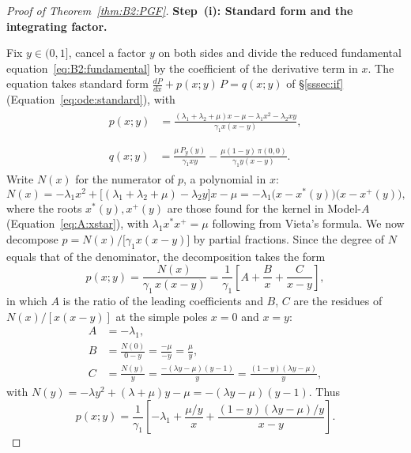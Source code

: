 \begin{proof}[Proof of Theorem~\ref{thm:B2:PGF}]

\medskip\noindent\textbf{Step~(i): Standard form and the integrating factor.}

Fix $y\in(0,1]$, cancel a factor $y$ on both sides and divide the reduced fundamental equation~\eqref{eq:B2:fundamental} by the coefficient of the derivative term in $x$. The equation takes standard form $\tfrac{dP}{dx}+p(x;y)\,P=q(x;y)$ of \S\ref{sssec:if} (Equation~\eqref{eq:ode:standard}), with
\begin{align}
    \begin{split}
        p(x;y) &= \frac{(\lambda_1+\lambda_2+\mu)x - \mu - \lambda_1 x^2 - \lambda_2 xy}{\gamma_1 x(x-y)},
        \label{eq:B2:pxy}\\[4pt]
    \end{split} \\
    \begin{split}
        q(x;y) &= \frac{\mu\,P_y(y)}{\gamma_1 xy} - \frac{\mu(1-y)\,\pi(0,0)}{\gamma_1 y(x-y)}.
        \label{eq:B2:qxy}
    \end{split}
\end{align}
Write $N(x)$ for the numerator of $p$, a polynomial in $x$:
\begin{equation*}
    N(x) = -\lambda_1 x^2 + \bigl[(\lambda_1+\lambda_2+\mu)-\lambda_2 y\bigr]x - \mu
         = -\lambda_1\bigl(x-x^*(y)\bigr)\bigl(x-x^+(y)\bigr),
\end{equation*}
where the roots $x^*(y),x^+(y)$ are those found for the kernel in Model-$A$ (Equation~\eqref{eq:A:xstar}), with $\lambda_1 x^* x^+ = \mu$ following from Vieta's formula. We now decompose $p = N(x)/\bigl[\gamma_1 x(x-y)\bigr]$ by partial fractions. Since the degree of $N$ equals that of the denominator, the decomposition takes the form
\begin{equation*}
    p(x;y) = \frac{N(x)}{\gamma_1\,x(x-y)}
           = \frac{1}{\gamma_1}\left[A + \frac{B}{x} + \frac{C}{x-y}\right],
\end{equation*}
in which $A$ is the ratio of the leading coefficients and $B$, $C$ are the residues of $N(x)/[x(x-y)]$ at the simple poles $x=0$ and $x=y$:
\begin{align*}
    A &= -\lambda_1, \nonumber\\
    B &= \frac{N(0)}{0-y} = \frac{-\mu}{-y} = \frac{\mu}{y}, \nonumber\\
    C &= \frac{N(y)}{y} = \frac{-(\lambda y-\mu)(y-1)}{y}
       = \frac{(1-y)(\lambda y-\mu)}{y},
\end{align*}
with $N(y)=-\lambda y^2+(\lambda+\mu)y-\mu=-(\lambda y-\mu)(y-1)$. Thus
\begin{equation}
    p(x;y) = \frac{1}{\gamma_1}\!\left[
        -\lambda_1 + \frac{\mu/y}{x} + \frac{(1-y)(\lambda y-\mu)/y}{x-y}
    \right].
    \label{eq:B2:pfrac}
\end{equation}


\end{proof}
